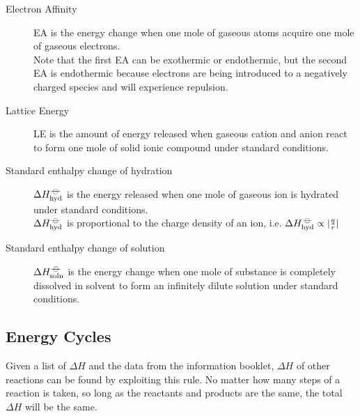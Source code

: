 \documentclass[../main]{subfiles}
\begin{document}
\begin{description}
		\item[Electron Affinity] EA is the energy change when one mole of gaseous atoms acquire one mole of gaseous electrons. \\
		Note that the first EA can be exothermic or endothermic, but the second EA is endothermic because electrons are being introduced to a negatively charged species and will experience repulsion.
		
		\item[Lattice Energy] LE is the amount of energy released when gaseous cation and anion  react to form one mole of solid ionic compound under standard conditions.
		
		\item[Standard enthalpy change of hydration] \(\Delta H_\text{hyd}^{-\kern-4pt{\ominus}\kern-4pt-}\) is the energy released when one mole of gaseous ion is hydrated under standard conditions. \\
		\(\Delta H_\text{hyd}^{-\kern-4pt{\ominus}\kern-4pt-}\) is proportional to the charge density of an ion, i.e. \(\Delta H_\text{hyd}^{-\kern-4pt{\ominus}\kern-4pt-} \propto | \frac{q}{r} |\)
		
		\item[Standard enthalpy change of solution] \(\Delta H_\text{soln}^{-\kern-4pt{\ominus}\kern-4pt-}\) is the energy change when one mole of substance is completely dissolved in solvent to form an infinitely dilute solution under standard conditions.

	\end{description}

	\subsection{Energy Cycles}


	Given a list of \(\Delta H\) and the data from the information booklet, \(\Delta H\) of other reactions can be found by exploiting this rule. No matter how many steps of a reaction is taken, so long as the reactants and products are the same, the total \(\Delta H\) will be the same. \\
\end{document}
